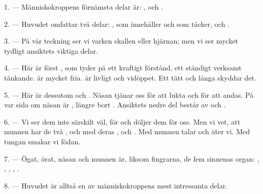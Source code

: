 
\VUsaut{4.0mm}
\VUsaut{2.0mm}

\VUsaut{2.4mm}
\VUsaut{3.0mm}

\VUsaut{3.0mm}

1. --- Människokroppens förnämsta delar är: ,  och
.

2. --- Huvudet omfattar två delar: , som innehåller
 och som  täcker, och .

3. --- På vår teckning ser vi varken skallen eller hjärnan; men vi ser mycket tydligt
ansiktets viktiga delar.

4. --- Här är först , som tyder på ett kraftigt förstånd, ett ständigt verksamt
tänkande.  är mycket fria.  är livligt och vidöppet. Ett tätt
 och långa
 skyddar det.

5. --- Här är dessutom  och . Näsan tjänar oss för att lukta
och för att andas. På var sida om näsan är , längre bort .
Ansiktets nedre del består av  och
.

6. --- Vi ser dem inte särskilt väl, för  och
 döljer dem för oss. Men vi vet, att munnen har de två
,  och  med deras
, och . Med munnen talar och äter vi. Med tungan
smakar vi födan.

7. --- Ögat, örat, näsan och munnen är, liksom fingrarna, de fem sinnenas organ:
, , , ,
.

8. --- Huvudet är alltså en av människokroppens mest intressanta delar.

